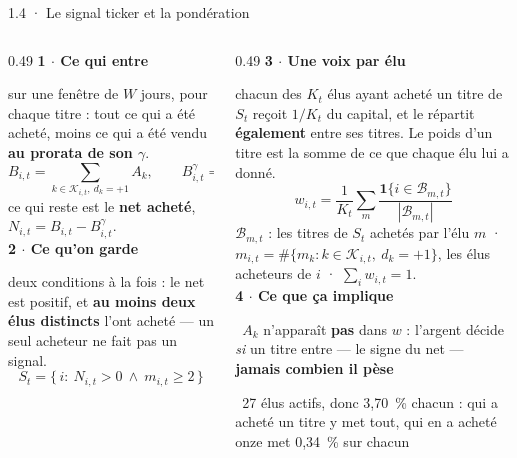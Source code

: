 \documentclass[11pt,aspectratio=169]{beamer}
\newcommand{\et}[2]{{\color{bleu}\bfseries #1 $\cdot$ #2}\par\vspace{0.6mm}}
\newcommand{\obs}[1]{{\color{bleu}\scriptsize\textbullet}~{\scriptsize #1}\par\vspace{0.4mm}}
\begin{document}
\begin{frame}{1.4 · Le signal ticker et la pondération}
  \begin{columns}[T]
    \begin{column}{0.49\textwidth}
      \et{1}{Ce qui entre}
      {\scriptsize sur une fenêtre de $W$ jours, pour chaque titre : tout ce qui a été acheté,
       moins ce qui a été vendu \textbf{au prorata de son $\gamma$}.}
      \vspace{-1mm}
      {\footnotesize\[ B_{i,t} = \sum_{k \in \mathcal K_{i,t},\ d_k = +1} A_k, \qquad
                       B^{\gamma}_{i,t} = \sum_{k \in \mathcal K_{i,t},\ d_k = -1} \gamma_k A_k \]}
      \vspace{-1mm}
      {\scriptsize ce qui reste est le \textbf{net acheté},
       $N_{i,t} = B_{i,t} - B^{\gamma}_{i,t}$.}\\[2.5mm]
      \et{2}{Ce qu'on garde}
      {\scriptsize deux conditions à la fois : le net est positif, et \textbf{au moins deux élus
       distincts} l'ont acheté --- un seul acheteur ne fait pas un signal.}
      \vspace{-1mm}
      {\footnotesize\[ S_t = \{\, i :\ N_{i,t} > 0 \ \wedge\ m_{i,t} \geq 2 \,\} \]}
    \end{column}
    \begin{column}{0.49\textwidth}
      \et{3}{Une voix par élu}
      {\scriptsize chacun des $K_t$ élus ayant acheté un titre de $S_t$ reçoit $1/K_t$ du capital,
       et le répartit \textbf{également} entre ses titres. Le poids d'un titre est la somme de ce
       que chaque élu lui a donné.}
      \vspace{-1mm}
      {\footnotesize\[ w_{i,t} = \frac{1}{K_t}\sum_m
                   \frac{\mathbf 1\{i \in \mathcal B_{m,t}\}}{|\mathcal B_{m,t}|} \]}
      \vspace{-1mm}
      {\scriptsize $\mathcal B_{m,t}$ : les titres de $S_t$ achetés par l'élu $m$ ·
       $m_{i,t} = \#\{m_k : k \in \mathcal K_{i,t},\ d_k = +1\}$, les élus acheteurs de $i$ ·
       $\sum_i w_{i,t} = 1$.}\\[2.5mm]
      \et{4}{Ce que ça implique}
      \obs{$A_k$ n'apparaît \textbf{pas} dans $w$ : l'argent décide \emph{si} un titre entre ---
       le signe du net --- \textbf{jamais combien il pèse}}
      \obs{27 élus actifs, donc 3,70~\% chacun : qui a acheté un titre y met tout, qui en a
       acheté onze met 0,34~\% sur chacun}
    \end{column}
  \end{columns}
\end{frame}
\end{document}
